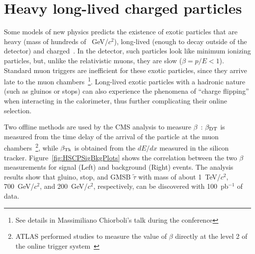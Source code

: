 \documentclass{cmspaper}
\begin{document}
\section{Heavy long-lived charged particles} \label{HSCP}
Some models of new physics predicts the existence 
of exotic particles that are heavy (mass of hundreds of ~GeV/$c^2$), 
long-lived (enough to decay outside of the detector) and charged~\cite{Fairbairn:2006gg}. 
In the detector, such particles look like 
minimum ionizing particles, but, unlike the 
relativistic muons, they are slow ($\beta=p/E<1$). 
Standard muon triggers are inefficient for these exotic particles, 
since they arrive late to the muon chambers~\footnote{See details 
in Massimiliano Chiorboli's talk during the conference}. 
Long-lived exotic particles with a hadronic nature (such as gluinos or stops) 
can also experience the phenomena of ``charge flipping'' when interacting 
in the calorimeter, thus further complicating their online selection.

Two offline methods are used by the 
CMS analysis to measure $\beta$~\cite{HSCP}:
$\beta_{{\rm DT}}$ is measured from the time delay of the arrival of the particle
at the muon chambers~\footnote{ATLAS performed studies to measure 
the value of $\beta$ directly at the level 2 of the online 
trigger system~\cite{Aad:2009wy}}, while $\beta_{{\rm Tk}}$ 
is obtained from the $dE/dx$ measured in the silicon tracker. 
Figure~\ref{fig:HSCPSigBkgPlots} shows the correlation between 
the two $\beta$ measurements for signal (Left) 
and background (Right) events. The analysis results show that 
gluino, stop, and GMSB $\tilde{\tau}$  with mass of about 
1~TeV/$c^2$, 700~GeV/$c^2$, and 200~GeV/$c^2$, 
respectively, can be discovered with 100~pb$^{-1}$ of data.
\end{document}
